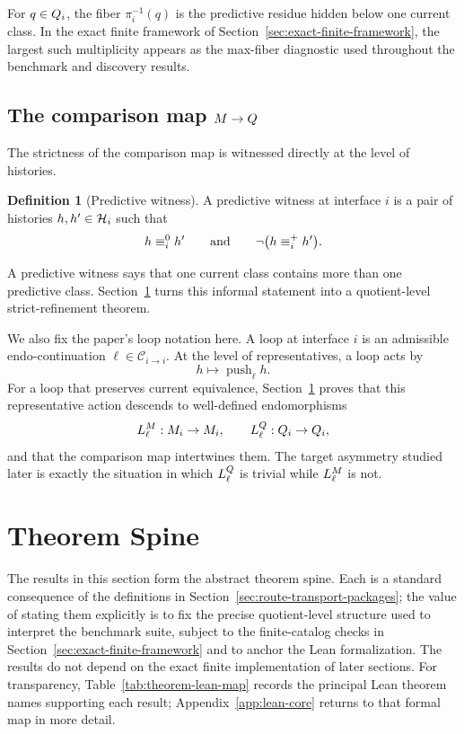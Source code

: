 \documentclass[11pt]{article}
\theoremstyle{definition}
\newtheorem{definition}[theorem]{Definition}
\begin{document}
For $q\in Q_i$, the fiber $\pi_i^{-1}(q)$ is the predictive residue hidden below one current class. In the exact finite framework of Section~\ref{sec:exact-finite-framework}, the largest such multiplicity appears as the max-fiber diagnostic used throughout the benchmark and discovery results.

\subsection{The comparison map \texorpdfstring{$M \to Q$}{M to Q}}\label{subsec:rtp-comparison}
The strictness of the comparison map is witnessed directly at the level of histories.

\begin{definition}[Predictive witness]\label{def:predictive-witness}
A predictive witness at interface $i$ is a pair of histories $h,h'\in\mathcal{H}_i$ such that
\begin{equation}
h \equiv^{0}_i h'
\qquad\text{and}\qquad
\neg\bigl(h \equiv^{+}_i h'\bigr).
\label{eq:predictive-witness}
\end{equation}
\end{definition}

A predictive witness says that one current class contains more than one predictive class. Section~\ref{sec:theorem-spine} turns this informal statement into a quotient-level strict-refinement theorem.

We also fix the paper's loop notation here. A loop at interface $i$ is an admissible endo-continuation $\ell\in\mathcal{C}_{i\to i}$. At the level of representatives, a loop acts by
\begin{equation}
h \longmapsto \operatorname{push}_{\ell} h.
\label{eq:loop-representative-action}
\end{equation}
For a loop that preserves current equivalence, Section~\ref{sec:theorem-spine} proves that this representative action descends to well-defined endomorphisms
\[
L^{M}_{\ell} : M_i \to M_i,
\qquad
L^{Q}_{\ell} : Q_i \to Q_i,
\]
and that the comparison map intertwines them. The target asymmetry studied later is exactly the situation in which $L^{Q}_{\ell}$ is trivial while $L^{M}_{\ell}$ is not.

\section{Theorem Spine}\label{sec:theorem-spine}
The results in this section form the abstract theorem spine. Each is a standard consequence of the definitions in Section~\ref{sec:route-transport-packages}; the value of stating them explicitly is to fix the precise quotient-level structure used to interpret the benchmark suite, subject to the finite-catalog checks in Section~\ref{sec:exact-finite-framework} and to anchor the Lean formalization. The results do not depend on the exact finite implementation of later sections. For transparency, Table~\ref{tab:theorem-lean-map} records the principal Lean theorem names supporting each result; Appendix~\ref{app:lean-core} returns to that formal map in more detail.
\end{document}
